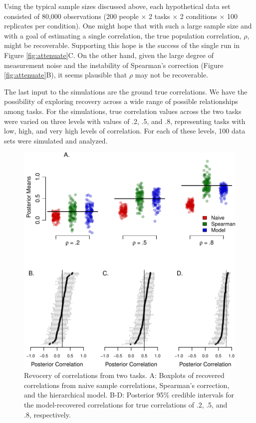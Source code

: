 \documentclass[
  english,
  ,man]{apa6}
\begin{document}
Using the typical sample sizes discussed above, each hypothetical data set consisted of 80,000 observations (200 people \(\times\) 2 tasks \(\times\) 2 conditions \(\times\) 100 replicates per condition). One might hope that with such a large sample size and with a goal of estimating a single correlation, the true population correlation, \(\rho\), might be recoverable. Supporting this hope is the success of the single run in Figure \ref{fig:attenuate}C. On the other hand, given the large degree of measurement noise and the instability of Spearman's correction (Figure \ref{fig:attenuate}B), it seems plausible that \(\rho\) may not be recoverable.

The last input to the simulations are the ground true correlations. We have the possibility of exploring recovery across a wide range of possible relationships among tasks. For the simulations, true correlation values across the two tasks were varied on three levels with values of .2, .5, and .8, representing tasks with low, high, and very high levels of correlation. For each of these levels, 100 data sets were simulated and analyzed.

\begin{figure}
\centering
\includegraphics{p_files/figure-latex/recov2-1.pdf}
\caption{\label{fig:recov2}Revocery of correlations from two tasks. A: Boxplots of recovered correlations from naive sample correlations, Spearman's correction, and the hierarchical model. B-D: Posterior 95\% credible intervals for the model-recovered correlations for true correlations of .2, .5, and .8, respectively.}
\end{figure}
\end{document}
